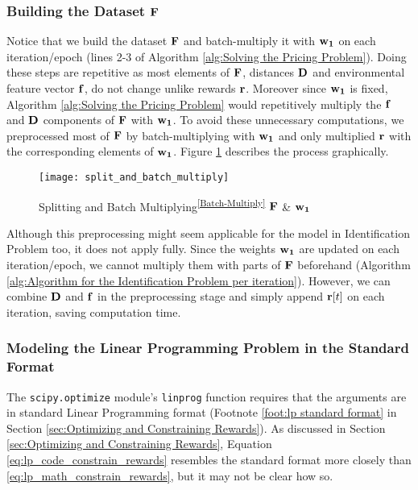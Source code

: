 \begin{appendices}
    \subsubsection{Building the Dataset $\mathbf{F}$}
    Notice that we build the dataset $\mathbf{F}$ and batch-multiply it with $\mathbf{w_1}$ on each iteration/epoch (lines 2-3 of Algorithm \ref{alg:Solving the Pricing Problem}). Doing these steps are repetitive as most elements of $\mathbf{F}$, distances $\mathbf{D}$ and environmental feature vector $\mathbf{f}$, do not change unlike rewards $\mathbf{r}$. Moreover since $\mathbf{w_1}$ is fixed, Algorithm \ref{alg:Solving the Pricing Problem} would repetitively multiply the $\mathbf{f}$ and $\mathbf{D}$ components of $\mathbf{F}$ with $\mathbf{w_1}$. To avoid these unnecessary computations, we preprocessed most of $\mathbf{F}$ by batch-multiplying with $\mathbf{w_1}$ and only multiplied $\mathbf{r}$ with the corresponding elements of $\mathbf{w_1}$. Figure \ref{fig:Splitting and Batch Multiplying F and w1} describes the process graphically.\\
    \begin{figure}[H]
        \centering
        \texttt{[image: split\_and\_batch\_multiply]}
        \caption{Splitting and Batch Multiplying\textsuperscript{\ref{Batch-Multiply}} $\mathbf{F}$ \& $\mathbf{w_1}$}
        \label{fig:Splitting and Batch Multiplying F and w1}
    \end{figure}    
    Although this preprocessing might seem applicable for the model in Identification Problem too, it does not apply fully. Since the weights $\mathbf{w_1}$ are updated on each iteration/epoch, we cannot multiply them with parts of $\mathbf{F}$ beforehand (Algorithm \ref{alg:Algorithm for the Identification Problem per iteration}). However, we can combine $\mathbf{D}$ and $\mathbf{f}$ in the preprocessing stage and simply append $\mathbf{r}[t]$ on each iteration, saving computation time.
    
    \subsubsection{Modeling the Linear Programming Problem in the Standard Format}
    The \texttt{scipy.optimize} module's \texttt{linprog} function requires that the arguments are in standard Linear Programming format (Footnote \ref{foot:lp standard format} in Section \ref{sec:Optimizing and Constraining Rewards}). As discussed in Section \ref{sec:Optimizing and Constraining Rewards}, Equation \ref{eq:lp_code_constrain_rewards} resembles the standard format more closely than \ref{eq:lp_math_constrain_rewards}, but it may not be clear how so.\\
    

\end{appendices}
